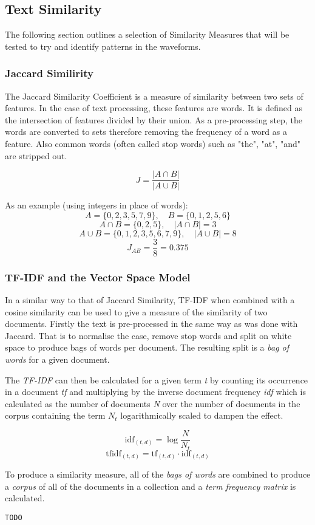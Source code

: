 \documentclass[../report.tex]{subfiles}
\begin{document}
\subsection{Text Similarity}

	The following section outlines a selection of Similarity Measures that will be tested to try and identify patterns in the waveforms.

\subsubsection{Jaccard Similirity} \label{sec:jaccard}

	The Jaccard Similarity Coefficient is a measure of similarity between two sets of features.  In the case of text processing, these features are words.  It is defined as the intersection of features divided by their union.  As a pre-processing step, the words are converted to sets therefore removing the frequency of a word as a feature.  Also common words (often called stop words) such as "the", "at", "and" are stripped out.
	
	$$
	J = \frac{|A \cap B|}{|A \cup B|}
	$$
	
	As an example (using integers in place of words):
	$$ A = \{0, 2, 3, 5, 7, 9\},\quad B = \{0, 1, 2, 5, 6\} $$
	$$ A\cap B = \{0, 2, 5\},\quad |A\cap B| = 3 $$
	$$ A\cup B = \{0, 1, 2, 3, 5, 6, 7, 9\},\quad |A\cup B| = 8	$$
	$$ J_{AB} = \frac{3}{8} = 0.375 $$

\subsubsection{TF-IDF and the Vector Space Model}
	
	In a similar way to that of Jaccard Similarity, TF-IDF when combined with a cosine similarity can be used to give a measure of the similarity of two documents.  Firstly the text is pre-processed in the same way as was done with Jaccard.  That is to normalise the case, remove stop words and split on white space to produce bags of words per document.  The resulting split is a \textit{bag of words} for a given document.
	
	The \textit{TF-IDF} can then be calculated for a given term \textit{t} by counting its occurrence in a document \textit{tf} and multiplying by the inverse document frequency \textit{idf} which is calculated as the number of documents \textit{N} over the number of documents in the corpus containing the term \textit{$N_{t}$} logarithmically scaled to dampen the effect.
	
	$$ \text{idf}_{(t,d)} = \log{\frac{N}{N_{t}}}$$
	$$ \text{tfidf}_{(t, d)} = \text{tf}_{(t,d)} \cdot \text{idf}_{(t,d)} $$
	
	To produce a similarity measure, all of the \textit{bags of words} are combined to produce a \textit{corpus} of all of the documents in a collection and a \textit{term frequency matrix} is calculated.
	
	\verb|TODO|
\end{document}
